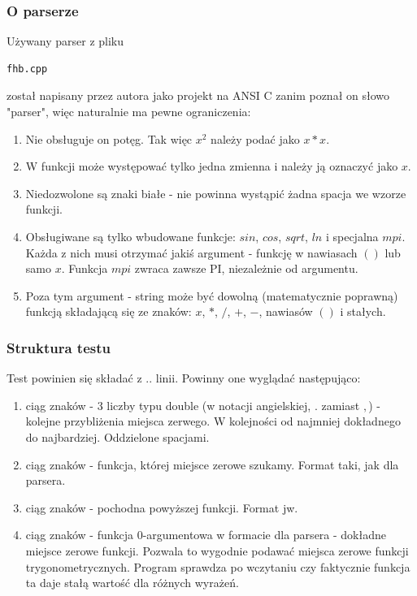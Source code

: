 \documentclass[11pt,wide]{mwart}
\begin{document}
\subsubsection{O parserze}
Używany parser z pliku
\begin{verbatim}fhb.cpp\end{verbatim}
został napisany przez autora jako projekt na ANSI C zanim poznał on słowo "parser", więc naturalnie ma pewne ograniczenia:
\begin{enumerate}
\item
  Nie obsługuje on potęg. Tak więc $x^2$ należy podać jako $x*x$.
\item
  W funkcji może występować tylko jedna zmienna i należy ją oznaczyć jako $x$.
\item
  Niedozwolone są znaki białe - nie powinna wystąpić żadna spacja we wzorze funkcji.
\item
  Obsługiwane są tylko wbudowane funkcje: $sin$, $cos$, $sqrt$, $ln$ i specjalna $mpi$. Każda z nich musi otrzymać jakiś argument - funkcję w nawiasach $( )$ lub samo $x$. Funkcja $mpi$ zwraca zawsze PI, niezależnie od argumentu.
\item
  Poza tym argument - string może być dowolną (matematycznie poprawną) funkcją składającą się ze znaków: $x$, $*$, $/$, $+$, $-$, nawiasów $( )$ i stałych.
\end{enumerate}

\subsubsection{Struktura testu}
Test powinien się składać z .. linii. Powinny one wyglądać następująco:
\begin{enumerate}
  \item
    ciąg znaków - 3 liczby typu double (w notacji angielskiej, $.$ zamiast $,$) - kolejne przybliżenia miejsca zerwego. W kolejności od najmniej dokładnego do najbardziej. Oddzielone spacjami.
  \item
    ciąg znaków - funkcja, której miejsce zerowe szukamy. Format taki, jak dla parsera.
  \item
    ciąg znaków - pochodna powyższej funkcji. Format jw.
  \item
    ciąg znaków - funkcja 0-argumentowa w formacie dla parsera - dokładne miejsce zerowe funkcji. Pozwala to wygodnie podawać miejsca zerowe funkcji trygonometrycznych. Program sprawdza po wczytaniu czy faktycznie funkcja ta daje stałą wartość dla różnych wyrażeń.
\end{enumerate}
\end{document}
